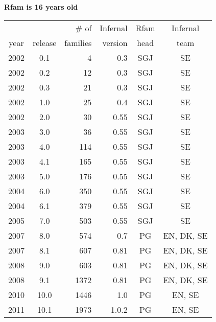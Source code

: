 \documentclass[landscape]{slides}
\begin{document}
\begin{slide}

\begin{center}
\large{\textbf{Rfam is 16 years old}}
\end{center}

\bigskip

\scriptsize

\begin{center}
\begin{tabular}{ccrrcc} \hline
     &         &    \# of & Infernal& Rfam & Infernal \\
year & release & families & version & head & team \\ \hline
2002 & 0.1     &        4 &     0.3 & SGJ  & SE  \\
2002 & 0.2     &       12 &     0.3 & SGJ  & SE  \\
2002 & 0.3     &       21 &     0.3 & SGJ  & SE  \\
2002 & 1.0     &       25 &     0.4 & SGJ  & SE  \\
2002 & 2.0     &       30 &     0.55 & SGJ  & SE  \\
2003 & 3.0     &       36 &     0.55 & SGJ  & SE  \\
2003 & 4.0     &      114 &     0.55 & SGJ  & SE  \\
2003 & 4.1     &      165 &     0.55 & SGJ  & SE  \\
2003 & 5.0     &      176 &     0.55 & SGJ  & SE  \\
2004 & 6.0     &      350 &     0.55 & SGJ  & SE  \\
2004 & 6.1     &      379 &     0.55& SGJ  & SE  \\
2005 & 7.0     &      503 &     0.55& SGJ  & SE  \\
2007 & 8.0     &      574 &     0.7 & PG  & EN, DK, SE  \\
2007 & 8.1     &      607 &     0.81& PG  & EN, DK, SE  \\
2008 & 9.0     &      603 &     0.81& PG  & EN, DK, SE  \\
2008 & 9.1     &     1372 &     0.81& PG  & EN, DK, SE  \\
2010 & 10.0    &     1446 &     1.0  & PG  & EN, SE \\
2011 & 10.1    &     1973 &    1.0.2 & PG  & EN, SE \\

\end{tabular}
\end{center}
\end{slide}
\end{document}
